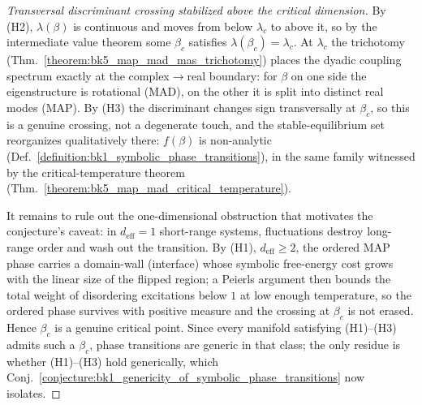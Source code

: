 \begin{proof}[Transversal discriminant crossing stabilized above the critical dimension]
\label{proof:bk1_conditional_genericity_of_symbolic_phase_transitions}
\leavevmode
By (H2), $\lambda(\beta)$ is continuous and moves from below $\lambda_c$ to
above it, so by the intermediate value theorem some $\beta_c$ satisfies
$\lambda(\beta_c)=\lambda_c$. At $\lambda_c$ the trichotomy
(Thm.~\ref{theorem:bk5_map_mad_mas_trichotomy}) places the dyadic coupling
spectrum exactly at the complex$\to$real boundary: for $\beta$ on one side the
eigenstructure is rotational (MAD), on the other it is split into distinct real
modes (MAP). By (H3) the discriminant changes sign transversally at $\beta_c$,
so this is a genuine crossing, not a degenerate touch, and the stable-equilibrium
set reorganizes qualitatively there: $f(\beta)$ is non-analytic
(Def.~\ref{definition:bk1_symbolic_phase_transitions}), in the same family
witnessed by the critical-temperature theorem
(Thm.~\ref{theorem:bk5_map_mad_critical_temperature}).

It remains to rule out the one-dimensional obstruction that motivates the
conjecture's caveat: in $d_{\mathrm{eff}}=1$ short-range systems, fluctuations
destroy long-range order and wash out the transition. By (H1),
$d_{\mathrm{eff}}\ge 2$, the ordered MAP phase carries a domain-wall (interface)
whose symbolic free-energy cost grows with the linear size of the flipped region;
a Peierls argument then bounds the total weight of disordering excitations below
$1$ at low enough temperature, so the ordered phase survives with positive
measure and the crossing at $\beta_c$ is not erased. Hence $\beta_c$ is a genuine
critical point. Since every manifold satisfying (H1)--(H3) admits such a
$\beta_c$, phase transitions are generic in that class; the only residue is
whether (H1)--(H3) hold generically, which
Conj.~\ref{conjecture:bk1_genericity_of_symbolic_phase_transitions} now isolates.
\end{proof}

